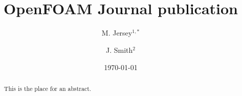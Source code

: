 \documentclass[e-only,10pt,reqno]{ofj}
\newcommand{\OF}[0]{OpenFOAM\textsuperscript{\textregistered} }
\begin{document}


\title[\OF Journal publication]{\OF Journal publication}





\author{M. Jersey$^{1,*}$}
\address{$^1$Address1}

\author{J. Smith$^2$}
\address{$2$Address2} %




\begin{abstract}
This is the place for an abstract.
\end{abstract}


\date{\today}

\dedicatory{}


\maketitle

\vspace{2ex}\vspace{1ex}

\linenumbers
\end{document}
